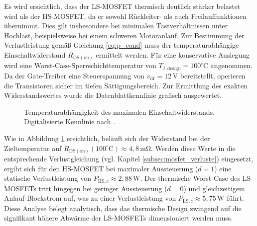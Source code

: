 Es wird ersichtlich, dass der LS-MOSFET thermisch deutlich stärker belastet wird als der HS-MOSFET, da er sowohl Rückleiter- als auch Freilauffunktionen übernimmt. Dies gilt insbesondere bei minimalen Tastverhältnissen unter Hochlast, beispielsweise bei einem schweren Motoranlauf. 
Zur Bestimmung der Verlustleistung gemäß Gleichung \ref{eq:p_cond} muss der temperaturabhängige Einschaltwiderstand $R_{\mathrm{DS(on)}}$ ermittelt werden. Für eine konservative Auslegung wird eine Worst-Case-Sperrschichttemperatur von $T_{\mathrm{J,design}} = 100^\circ\mathrm{C}$ angenommen. Da der Gate-Treiber eine Steuerspannung von $v_{\mathrm{dr}} = 12\,\mathrm{V}$ bereitstellt, operieren die Transistoren sicher im tiefen Sättigungsbereich. Zur Ermittlung des exakten Widerstandswertes wurde die Datenblattkennlinie grafisch ausgewertet.
\begin{figure}[htbp]
    \centering
    \caption{Temperaturabhängigkeit des maximalen Einschaltwiderstands. Digitalisierte Kennlinie nach \cite[Diagramm 9]{DS_IPP034N08N5}.}
    \label{fig:rdson_temp}
\end{figure}
Wie in Abbildung \ref{fig:rdson_temp} ersichtlich, beläuft sich der Widerstand bei der Zieltemperatur auf $R_{\mathrm{DS(on)}}(100^\circ\mathrm{C}) \approx 4{,}8\,\mathrm{m\Omega}$. Werden diese Werte in die entsprechende Verlustgleichung (vgl. Kapitel \ref{subsec:mosfet_verluste}) eingesetzt, ergibt sich für den HS-MOSFET bei maximaler Aussteuerung ($d=1$) eine statische Verlustleistung von $P_{\mathrm{HS,c}} \approx 2{,}88\,\mathrm{W}$. Der thermische Worst-Case des LS-MOSFETs tritt hingegen bei geringer Aussteuerung ($d=0$) und gleichzeitigem Anlauf-Blockstrom auf, was zu einer Verlustleistung von $P_{\mathrm{LS,c}} \approx 5{,}75\,\mathrm{W}$ führt. Diese Analyse belegt analytisch, dass das thermische Design zwingend auf die signifikant höhere Abwärme der LS-MOSFETs dimensioniert werden muss.

